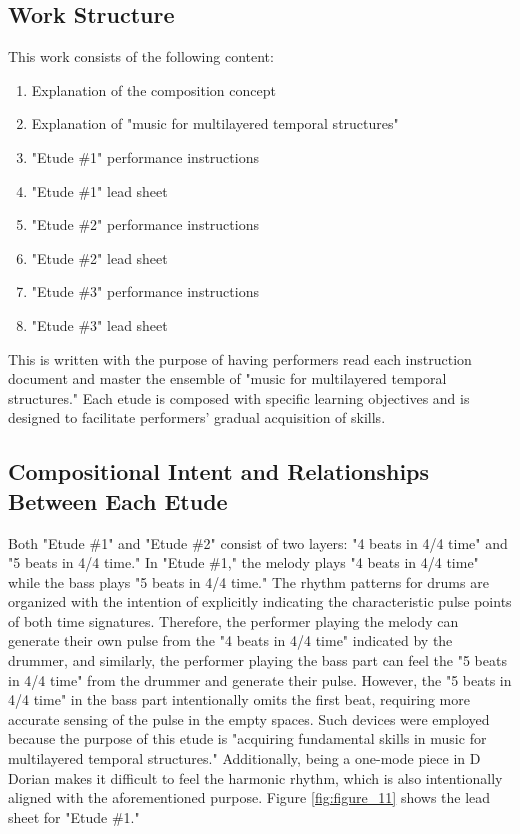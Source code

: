 \subsection{Work Structure}

This work consists of the following content:

\begin{enumerate}
  \item Explanation of the composition concept
  \item Explanation of "music for multilayered temporal structures"
	\item "Etude \#1" performance instructions
	\item "Etude \#1" lead sheet
	\item "Etude \#2" performance instructions
	\item "Etude \#2" lead sheet
	\item "Etude \#3" performance instructions
	\item "Etude \#3" lead sheet
\end{enumerate}

This is written with the purpose of having performers read each instruction document and master the ensemble of "music for multilayered temporal structures." Each etude is composed with specific learning objectives and is designed to facilitate performers' gradual acquisition of skills.

\subsection{Compositional Intent and Relationships Between Each Etude}

Both "Etude \#1" and "Etude \#2" consist of two layers: "4 beats in 4/4 time" and "5 beats in 4/4 time." In "Etude \#1," the melody plays "4 beats in 4/4 time" while the bass plays "5 beats in 4/4 time." The rhythm patterns for drums are organized with the intention of explicitly indicating the characteristic pulse points of both time signatures. Therefore, the performer playing the melody can generate their own pulse from the "4 beats in 4/4 time" indicated by the drummer, and similarly, the performer playing the bass part can feel the "5 beats in 4/4 time" from the drummer and generate their pulse. However, the "5 beats in 4/4 time" in the bass part intentionally omits the first beat, requiring more accurate sensing of the pulse in the empty spaces. Such devices were employed because the purpose of this etude is "acquiring fundamental skills in music for multilayered temporal structures." Additionally, being a one-mode piece in D Dorian makes it difficult to feel the harmonic rhythm, which is also intentionally aligned with the aforementioned purpose. Figure \ref{fig:figure_11} shows the lead sheet for "Etude \#1."

